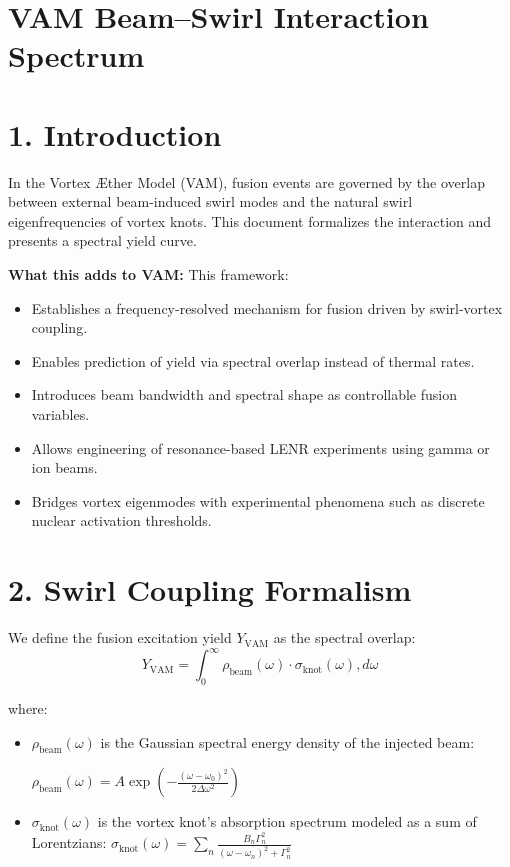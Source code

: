 
\section{VAM Beam--Swirl Interaction Spectrum}

\section*{1. Introduction}
In the Vortex Æther Model (VAM), fusion events are governed by the overlap between external beam-induced swirl modes and the natural swirl eigenfrequencies of vortex knots. This document formalizes the interaction and presents a spectral yield curve.

\textbf{What this adds to VAM:} This framework:
\begin{itemize}
\item Establishes a frequency-resolved mechanism for fusion driven by swirl-vortex coupling.
\item Enables prediction of yield via spectral overlap instead of thermal rates.
\item Introduces beam bandwidth and spectral shape as controllable fusion variables.
\item Allows engineering of resonance-based LENR experiments using gamma or ion beams.
\item Bridges vortex eigenmodes with experimental phenomena such as discrete nuclear activation thresholds.
\end{itemize}

\section*{2. Swirl Coupling Formalism}
We define the fusion excitation yield $Y_{\mathrm{VAM}}$ as the spectral overlap:
\begin{equation}
Y_{\mathrm{VAM}} = \int_0^\infty \rho_{\mathrm{beam}}(\omega) \cdot \sigma_{\mathrm{knot}}(\omega) , d\omega
\end{equation}

\noindent where:
\begin{itemize}
\item $\rho_{\mathrm{beam}}(\omega)$ is the Gaussian spectral energy density of the injected beam:

$\rho_{\mathrm{beam}}(\omega) = A \exp\left(-\frac{(\omega - \omega_0)^2}{2 \Delta \omega^2} \right)$
\item $\sigma_{\mathrm{knot}}(\omega)$ is the vortex knot's absorption spectrum modeled as a sum of Lorentzians:
$\sigma_{\mathrm{knot}}(\omega) = \sum_n \frac{B_n \Gamma_n^2}{(\omega - \omega_n)^2 + \Gamma_n^2}$
\end{itemize}

